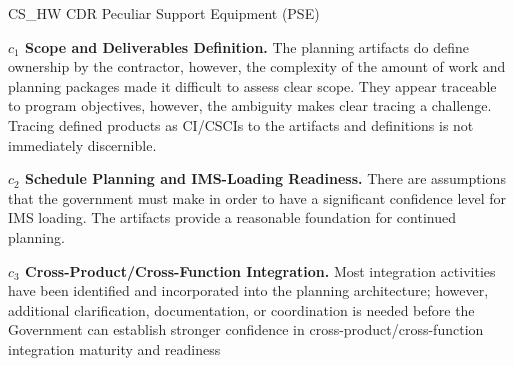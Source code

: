 %
\begin{frame}{CS\_HW CDR Peculiar Support Equipment (PSE)}
\begin{minipage}{0.90\textwidth}
\raggedright
\fontsize{8}{9.5}\selectfont
\textbf{\(c_1\) Scope and Deliverables Definition.}
The planning artifacts do define ownership by the contractor, however, the complexity of the amount of work and planning packages made it difficult to assess clear scope. They appear traceable to program objectives, however, the ambiguity makes clear tracing a challenge. Tracing defined products as CI/CSCIs to the artifacts and definitions is not immediately discernible.\par\vspace{0.6em}
\textbf{\(c_2\) Schedule Planning and IMS-Loading Readiness.}
There are assumptions that the government must make in order to have a significant confidence level for IMS loading. The artifacts provide a reasonable foundation for continued planning.\par\vspace{0.6em}
\textbf{\(c_3\) Cross-Product/Cross-Function Integration.}
Most integration activities have been identified and incorporated into the planning architecture; however, additional clarification, documentation, or coordination is needed before the Government can establish stronger confidence in cross-product/cross-function integration maturity and readiness\par\vspace{0.6em}
\end{minipage}
\end{frame}

\endinput
